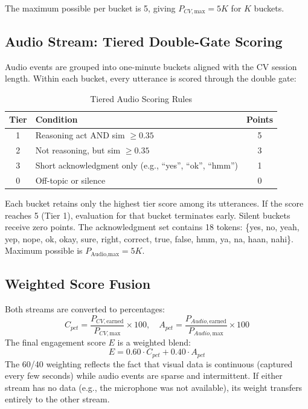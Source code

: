 \documentclass[conference]{IEEEtran}
\begin{document}
The maximum possible per bucket is 5, giving $P_{CV,\text{max}} = 5K$ for $K$ buckets.
\subsection{Audio Stream: Tiered Double-Gate Scoring}
Audio events are grouped into one-minute buckets aligned with the CV session length. Within each bucket, every utterance is scored through the double gate:

\begin{table}[htbp]
\caption{Tiered Audio Scoring Rules}
\begin{center}
\begin{tabular}{|c|p{3.8cm}|c|}
\hline
\textbf{Tier} & \textbf{Condition} & \textbf{Points} \\
\hline
1 & Reasoning act AND sim $\geq 0.35$ & 5 \\
\hline
2 & Not reasoning, but sim $\geq 0.35$ & 3 \\
\hline
3 & Short acknowledgment only (e.g., ``yes'', ``ok'', ``hmm'') & 1 \\
\hline
0 & Off-topic or silence & 0 \\
\hline
\end{tabular}
\label{tab:audio_tiers}
\end{center}
\end{table}

Each bucket retains only the highest tier score among its utterances. If the score reaches 5 (Tier 1), evaluation for that bucket terminates early. Silent buckets receive zero points. The acknowledgment set contains 18 tokens: \{yes, no, yeah, yep, nope, ok, okay, sure, right, correct, true, false, hmm, ya, na, haan, nahi\}. Maximum possible is $P_{\text{Audio,max}} = 5K$.

\subsection{Weighted Score Fusion}
Both streams are converted to percentages:
\begin{equation}
C_{pct} = \frac{P_{CV,\text{earned}}}{P_{CV,\text{max}}} \times 100, \quad
A_{pct} = \frac{P_{Audio,\text{earned}}}{P_{Audio,\text{max}}} \times 100
\label{eq:pct}
\end{equation}
The final engagement score $E$ is a weighted blend:
\begin{equation}
E = 0.60 \cdot C_{pct} + 0.40 \cdot A_{pct}
\label{eq:blend}
\end{equation}
The 60/40 weighting reflects the fact that visual data is continuous (captured every few seconds) while audio events are sparse and intermittent. If either stream has no data (e.g., the microphone was not available), its weight transfers entirely to the other stream.
\end{document}
